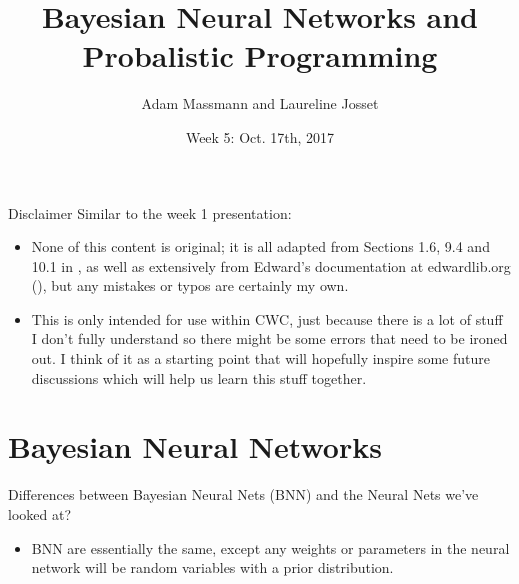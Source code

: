 \documentclass{beamer}
\title[Your Short Title]{Bayesian Neural  Networks and Probalistic Programming}
\author{Adam Massmann and Laureline Josset}
\institute{Water Center NN Meetings}
\date{Week 5: Oct. 17th, 2017}
\begin{document}
\begin{frame}
  \titlepage
\end{frame}


\begin{frame}{Disclaimer}
  Similar to the week 1 presentation:
  \begin{itemize}
  \item None of this content is original; it is all adapted from Sections 1.6, 9.4 and 10.1 in \cite{bishop}, as well as extensively from Edward's documentation at edwardlib.org (\cite{tran2016}), but any mistakes or typos are certainly my own.
  \item This is only intended for use within CWC, just because there is a lot of stuff I don't fully understand so there might be some errors that need to be ironed out. I think of it as a starting point that will hopefully inspire some future discussions which will help us learn this stuff together.
  \end{itemize}
\end{frame}

\section{Bayesian Neural Networks}
\begin{frame}{Differences between Bayesian Neural Nets (BNN) and the Neural Nets  we've looked at?}
  \begin{itemize}
  \item BNN are essentially the same, except any weights or parameters in the neural network will be random variables with a prior distribution.
  \end{itemize}
\end{frame}
\end{document}
